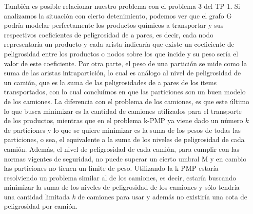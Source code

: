 También es posible relacionar nuestro problema con el problema 3 del TP 1. Si analizamos la situación con cierto detenimiento, podemos ver que el grafo G podría modelar perfectamente los productos químicos a transportar y sus respectivos coeficientes de peligrosidad de a pares, es decir, cada nodo representaría un producto y cada arista indicaría que existe un coeficiente de peligrosidad entre los productos o nodos sobre los que incide y su peso sería el valor de este coeficiente. Por otra parte, el peso de una partición se mide como la suma de las aristas intrapartición, lo cual es análogo al nivel de peligrosidad de un camión, que es la suma de las peligrosidades de a pares de los items transportados, con lo cual concluímos en que las particiones son un buen modelo de los camiones. La diferencia con el problema de los camiones, es que este último lo que busca minimizar es la cantidad de camiones utilizados para el transporte de los productos, mientras que en el problema k-PMP ya viene dado un número $k$ de particiones y lo que se quiere minimizar es la suma de los pesos de todas las particiones, o sea, el equivalente a la suma de los niveles de peligrosidad de cada camión. Además, el nivel de peligrosidad de cada camión, para cumplir con las normas vigentes de seguridad, no puede superar un cierto umbral M y en cambio las particiones no tienen un límite de peso. Utilizando la k-PMP estaría resolviendo un problema similar al de los camiones, es decir, estaría buscando minimizar la suma de los niveles de peligrosidad de los camiones y sólo tendría una cantidad limitada $k$ de camiones para usar y además no existiría una cota de peligrosidad por camión.
